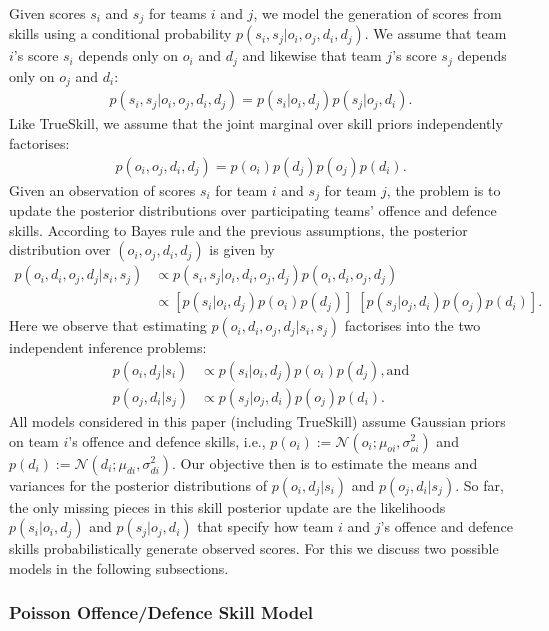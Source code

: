 Given scores $s_i$ and $s_j$ for teams $i$ and $j$, we model the
generation of scores from skills using a conditional probability
$p(s_i, s_j|o_i, o_j, d_i, d_j)$. We assume that team $i$'s score
$s_i$ depends only on $o_i$ and $d_j$ and likewise that team $j$'s
score $s_j$ depends only on $o_j$ and $d_i$:
\begin{align}
  p(s_i, s_j|o_i, o_j, d_i, d_j) = p(s_i|o_i,  d_j)p( s_j|o_j, d_i).
\label{eq:sampleAssumption}
\end{align}
Like TrueSkill, we assume that the joint marginal over skill
priors independently factorises:
\begin{align}
  p(o_i, o_j, d_i, d_j) = p(o_i) p(d_j) p(o_j) p(d_i).
\end{align}
Given an observation of scores $s_i$ for team $i$ and $s_j$ for team
$j$, the problem is to update the posterior distributions over
participating teams' offence and defence skills.  According to
Bayes rule and the previous assumptions, the posterior distribution
over $(o_i, o_j, d_i, d_j)$ is given by
\begin{align}\label{eq:Bay}
    p(o_i, d_i, o_j, d_j | s_i, s_j) & \propto p( s_i, s_j |o_i, d_i, o_j, d_j ) p(o_i, d_i, o_j, d_j) \nonumber \\
        & \propto [p(s_i|o_i,d_j) p(o_i) p(d_j)] \; [p(s_j|o_j,d_i)  p(o_j) p(d_i)].
\end{align}
Here we observe that estimating $p(o_i, d_i, o_j, d_j | s_i, s_j)$
factorises into the two independent inference problems:
\begin{align}
p(o_i, d_j|s_i) & \propto p(s_i|o_i,d_j) p(o_i) p(d_j), \text{and} \\
p(o_j, d_i|s_j) & \propto p(s_j|o_j,d_i) p(o_j) p(d_i).
\end{align}
All models considered in this paper (including TrueSkill) assume
Gaussian priors on team $i$'s offence and
defence skills, i.e., $p(o_i):=\mathcal{N}(o_i; \mu_{oi}, \sigma_{oi}^2)$
and $p(d_i):=\mathcal{N}(d_i; \mu_{di}, \sigma_{di}^2)$.  Our objective
then is to estimate the means and variances for the posterior distributions
of $p(o_i, d_j|s_i)$ and $p( o_j, d_i |s_j)$.  So far, the only missing pieces
in this skill posterior update are the likelihoods $p(s_i|o_i,d_j)$
and $p(s_j|o_j,d_i)$ that specify how team $i$ and $j$'s offence and
defence skills probabilistically generate observed scores.  For this
we discuss two possible models in the following subsections.

\subsubsection{Poisson Offence/Defence Skill Model}

